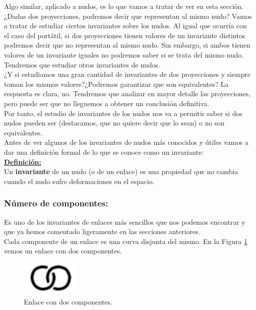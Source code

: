 \documentclass[14pt]{extarticle}
\begin{document}
Algo similar, aplicado a nudos, es lo que vamos a tratar de ver en esta sección. ¿Dadas dos proyecciones, podremos decir que representan al mismo nudo? Vamos a tratar de estudiar ciertos invariantes sobre los nudos. Al igual que ocurría con el caso del portátil, si dos proyecciones tienen valores de un invariante distintos podremos decir que no representan al mismo nudo. Sin embargo, si ambos tienen valores de un invariante iguales no podremos saber si se trata del mismo nudo. Tendremos que estudiar otros invariantes de nudos. \\

¿Y si estudiamos una gran cantidad de invariantes de dos proyecciones y siempre toman los mismos valores?¿Podremos garantizar que son equivalentes? La respuesta es clara, no. Tendremos que analizar en mayor detalle las proyecciones, pero puede ser que no lleguemos a obtener un conclusión definitiva. \\

    
Por tanto, el estudio de invariantes de los nudos nos va a permitir saber si dos nudos pueden ser (destacamos, que no quiere decir que lo sean) o no son equivalentes.\\


Antes de ver algunos de los invariantes de nudos más conocidos y útiles vamos a dar una definición formal de lo que se conoce como un invariante:\\

\underline{\textbf{Definición:}} \\
Un \textbf{invariante} de un nudo (o de un enlace) es una propiedad que no cambia cuando el nudo sufre deformaciones en el espacio. \\



\begin{center}
	\subsubsection{Número de componentes:}
\end{center}
Es uno de los invariantes de enlaces más sencillos que nos podemos encontrar y que ya hemos comentado ligeramente en las secciones anteriores.\\

Cada componente de un enlace es una curva disjunta del mismo. En la Figura \ref{inv1} vemos un enlace con dos componentes. 
  \begin{figure}[h!]
  	\includegraphics[width=2.7cm]{inudos/enlace.png}
  	\centering
  	\caption{Enlace con dos componentes.}
  	\label{inv1} 
  \end{figure}
  
\end{document}
